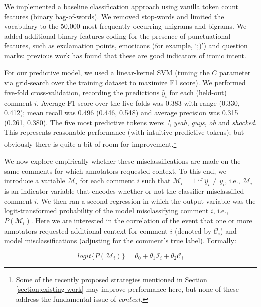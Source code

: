 \documentclass[11pt]{article}
\begin{document}
We implemented a baseline classification approach using vanilla token count features (binary bag-of-words). We removed stop-words and limited the vocabulary to the 50,000 most frequently occurring unigrams and bigrams. We added additional binary features coding for the presence of punctuational features, such as exclamation points, emoticons (for example, `;)') and question marks: previous work \cite{davidov_10,carvalho_09} has found that these are good indicators of ironic intent. 

For our predictive model, we used a linear-kernel SVM (tuning the $C$ parameter via grid-search over the training dataset to maximize F1 score). We performed five-fold cross-validation, recording the predictions $\hat{y}_i$ for each (held-out) comment $i$. Average F1 score over the five-folds was 0.383 with range (0.330, 0.412); mean recall was 0.496 (0.446, 0.548) and average precision was 0.315 (0.261, 0.380). The five most predictive tokens were: \emph{!}, \emph{yeah}, \emph{guys}, \emph{oh} and \emph{shocked}. This represents reasonable performance (with intuitive predictive tokens); but obviously there is quite a bit of room for improvement.\footnote{Some of the recently proposed strategies mentioned in Section \ref{section:existing-work} may improve performance here, but none of these address the fundamental issue of \emph{context}.} 

We now explore empirically whether these misclassifications are made on the same comments for which annotators requested context. To this end, we introduce a variable $\mathcal{M}_i$ for each comment $i$ such that $\mathcal{M}_i = 1$ if $\hat{y}_i \neq y_i$, i.e., $\mathcal{M}_i$ is an indicator variable that encodes whether or not the classifier misclassified comment $i$. We then ran a second regression in which the output variable was the logit-transformed probability of the model misclassifying comment $i$, i.e., $P(\mathcal{M}_i)$. Here we are interested in the correlation of the event that one or more annotators requested additional context for comment $i$ (denoted by $\mathcal{C}_i$) and model misclassifications (adjusting for the comment's true label). Formally:

\vspace{-2em}
\begin{equation}
	logit\{P(\mathcal{M}_i)\} = \theta_0 + \theta_1 \mathcal{I}_i + \theta_2 \mathcal{C}_i
	\label{equation:ml-regression}
\end{equation}
\vspace{-1.5em}
\end{document}
